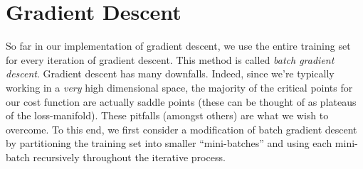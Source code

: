 \newcommand{\iter}[2]{{#1}^{\{{#2}\}}}


\section{Gradient Descent}

So far in our implementation of gradient descent, we use the entire training set for every iteration of gradient descent.  This method is called \textit{batch gradient descent}.  Gradient descent has many downfalls.  Indeed, since we're typically working in a \textit{very} high dimensional space, the majority of the critical points for our cost function are actually saddle points (these can be thought of as plateaus of the loss-manifold).  These pitfalls (amongst others) are what we wish to overcome.  To this end, we first consider a modification of batch gradient descent by partitioning the training set into smaller ``mini-batches'' and using each mini-batch recursively throughout the iterative process.  

